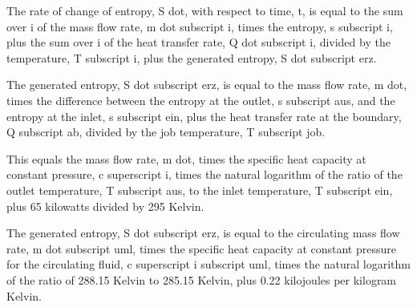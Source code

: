 The rate of change of entropy, S dot, with respect to time, t, is equal to the sum over i of the mass flow rate, m dot subscript i, times the entropy, s subscript i, plus the sum over i of the heat transfer rate, Q dot subscript i, divided by the temperature, T subscript i, plus the generated entropy, S dot subscript erz.

The generated entropy, S dot subscript erz, is equal to the mass flow rate, m dot, times the difference between the entropy at the outlet, s subscript aus, and the entropy at the inlet, s subscript ein, plus the heat transfer rate at the boundary, Q subscript ab, divided by the job temperature, T subscript job.

This equals the mass flow rate, m dot, times the specific heat capacity at constant pressure, c superscript i, times the natural logarithm of the ratio of the outlet temperature, T subscript aus, to the inlet temperature, T subscript ein, plus 65 kilowatts divided by 295 Kelvin.

The generated entropy, S dot subscript erz, is equal to the circulating mass flow rate, m dot subscript uml, times the specific heat capacity at constant pressure for the circulating fluid, c superscript i subscript uml, times the natural logarithm of the ratio of 288.15 Kelvin to 285.15 Kelvin, plus 0.22 kilojoules per kilogram Kelvin.